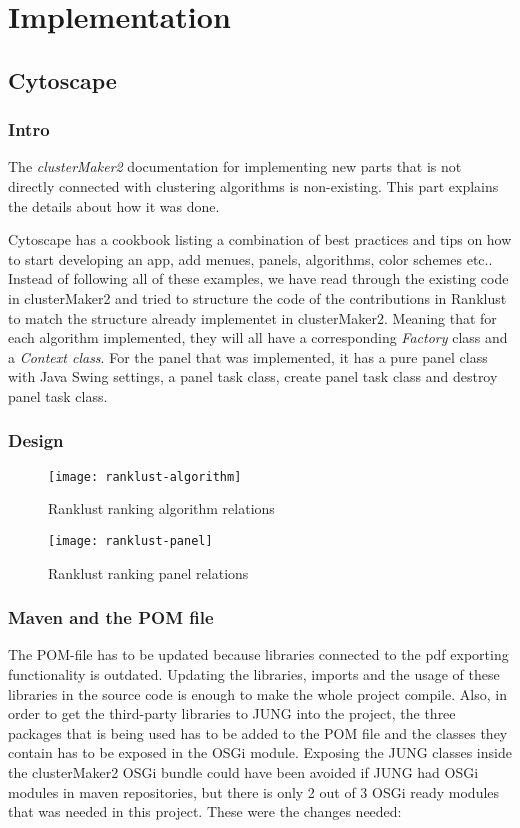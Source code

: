 \part{Implementation}
\label{pa:implementation}
\chapter{Cytoscape}
\section{Intro}
The \textit{clusterMaker2} documentation for implementing new parts that is not
directly connected with clustering algorithms is non-existing. This part
explains the details about how it was done.

Cytoscape has a cookbook\cite{cytoscape-cookbook} listing a combination of best
practices and tips on how to start developing an app, add menues, panels,
algorithms, color schemes etc.. Instead of following all of these examples, we
have read through the existing code in clusterMaker2\cite{cm2-github} and tried
to structure the code of the contributions in Ranklust to match the structure
already implementet in clusterMaker2. Meaning that for each algorithm
implemented, they will all have a corresponding \textit{Factory} class and a
\textit{Context class}. For the panel that was implemented, it has a pure panel
class with Java Swing\cite{java-swing} settings, a panel task class, create
panel task class and destroy panel task class. %

\section{Design}
\begin{figure}[H]
    \caption{Ranklust ranking algorithm relations}
    \label{fig:rank-alg}
    \texttt{[image: ranklust-algorithm]}
\end{figure}
\begin{figure}[H]
    \caption{Ranklust ranking panel relations}
    \label{fig:rank-panel}
    \texttt{[image: ranklust-panel]}
\end{figure}

\section{Maven and the POM file}
The POM-file has to be updated because libraries connected to the pdf exporting
functionality is outdated. Updating the libraries, imports and the usage of
these libraries in the source code is enough to make the whole project compile.
Also, in order to get the third-party libraries to JUNG\cite{jung} into the
project, the three packages that is being used has to be added to the POM file
and the classes they contain has to be exposed in the OSGi
module\cite{osgi-felix}. Exposing the JUNG classes inside the clusterMaker2 OSGi
bundle could have been avoided if JUNG had OSGi modules in maven repositories,
but there is only 2 out of 3 OSGi ready modules that was needed in this project.
These were the changes needed:

